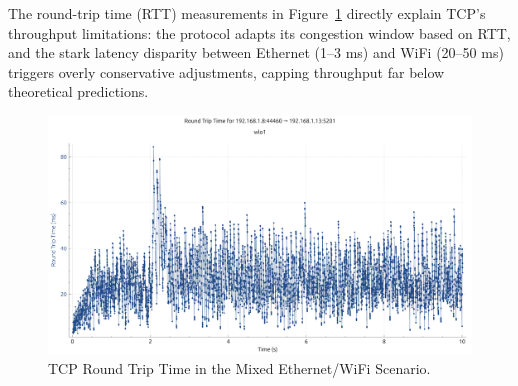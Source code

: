 \begin{enumerate}
                The round-trip time (RTT) measurements in Figure~\ref{fig:rtt-mix-tcp} directly explain TCP’s throughput limitations: the protocol adapts its congestion window based on RTT, and the stark latency disparity between Ethernet (1–3 ms) and WiFi (20–50 ms) triggers overly conservative adjustments, capping throughput far below theoretical predictions.

                \begin{figure}[ht]
                    \centering
                    \includegraphics[width=0.9\columnwidth]{images/graphs/RTT/RTT_MIX_TCP.pdf}
                    \caption{TCP Round Trip Time in the Mixed Ethernet/WiFi Scenario.}
                    \label{fig:rtt-mix-tcp}
                \end{figure}



            \vspace{0.2cm} %
                

\end{enumerate}
